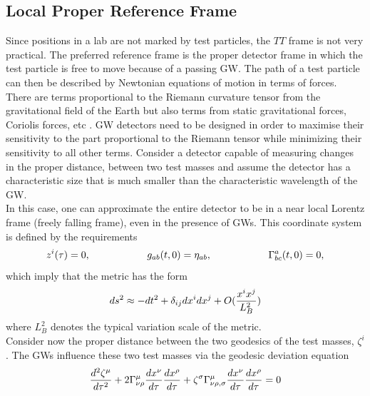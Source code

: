 \documentclass[binding=0.6cm, LaM]{sapthesis}
\begin{document}
\subsection{Local Proper Reference Frame}

        Since positions in a lab are not marked by test particles,
        the $TT$ frame is not very practical.
        The preferred reference frame is the proper detector frame
        in which the test particle is free to move because of a passing GW.
        The path of a test particle can then be described by Newtonian equations of motion in terms of forces.
        There are terms proportional to the Riemann curvature tensor from the gravitational field of the Earth
        but also terms from static gravitational forces, Coriolis forces, etc \cite{5}.
	GW detectors need to be designed in order to maximise their sensitivity to the part proportional to the Riemann tensor while minimizing their sensitivity to all other terms.
        Consider a detector capable of measuring changes in the proper distance, between two test masses
        and assume the detector has a characteristic size that is much smaller
        than the characteristic wavelength of the GW. \\
        In this case, one can approximate the entire detector to be in a near local Lorentz frame
        (freely falling frame), even in the presence of GWs. This coordinate system is defined by the requirements
                \begin{equation}
                	z^i(\tau) = 0, \hspace*{2cm} g_{ab}(t, 0) = \eta_{ab}, \hspace*{2cm} \Gamma^a_{bc}(t,0) = 0,
                \end{equation}
        which imply that the metric has the form
                \begin{equation}
                	ds^2 \approx -dt^2 + \delta_{ij}dx^i dx^j + O({{x^ix^j}\over{L^2_B}})
                \end{equation}
        where $L^2_B$ denotes the typical variation scale of the metric. \\
        Consider now the proper distance between the two geodesics of the test masses, $\zeta^i$.
        The GWs influence these two test masses via the geodesic deviation equation
                \begin{equation}
                	{{d^2\zeta^{\mu}}\over{d\tau^2}} + 2\Gamma^{\mu}_{\nu\rho}{{dx^{\nu}}\over{d\tau}}{{dx^\rho}\over{d\tau}} + \zeta^{\sigma}\Gamma^{\mu}_{\nu\rho,\sigma}{{dx^{\nu}}\over{d\tau}}{{dx^{\rho}}\over{d\tau}} = 0
                \end{equation}
\end{document}
